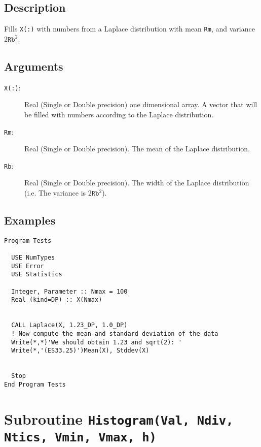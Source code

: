 \subsection{Description}

Fills \texttt{X(:)} with numbers from a Laplace distribution with mean
\texttt{Rm}, and variance $2\mathtt{Rb}^2$. 

\subsection{Arguments}

\begin{description}
\item[\texttt{X(:)}:] Real (Single or Double precision) one
  dimensional array. A vector that will be filled with numbers
  according to the Laplace distribution.
\item[\texttt{Rm}:] Real (Single or Double precision). The
  mean of the Laplace distribution.
\item[\texttt{Rb}:] Real (Single or Double precision). The
  width of the Laplace distribution (i.e. The variance is
  $2\mathtt{Rb}^2$).
\end{description}

\subsection{Examples}

\begin{lstlisting}[emph=Laplace,
                   emphstyle=\color{blue},
                   frame=trBL,
                   caption=Obtaining numbers with a Laplace distribution.,
                   label=laplace]
Program Tests

  USE NumTypes
  USE Error
  USE Statistics

  Integer, Parameter :: Nmax = 100
  Real (kind=DP) :: X(Nmax)


  CALL Laplace(X, 1.23_DP, 1.0_DP)
  ! Now compute the mean and standard deviation of the data
  Write(*,*)'We should obtain 1.23 and sqrt(2): '
  Write(*,'(ES33.25)')Mean(X), Stddev(X)


  Stop
End Program Tests
\end{lstlisting}

\section{Subroutine \texttt{Histogram(Val, Ndiv, Ntics, Vmin, Vmax,
    h)}} 

